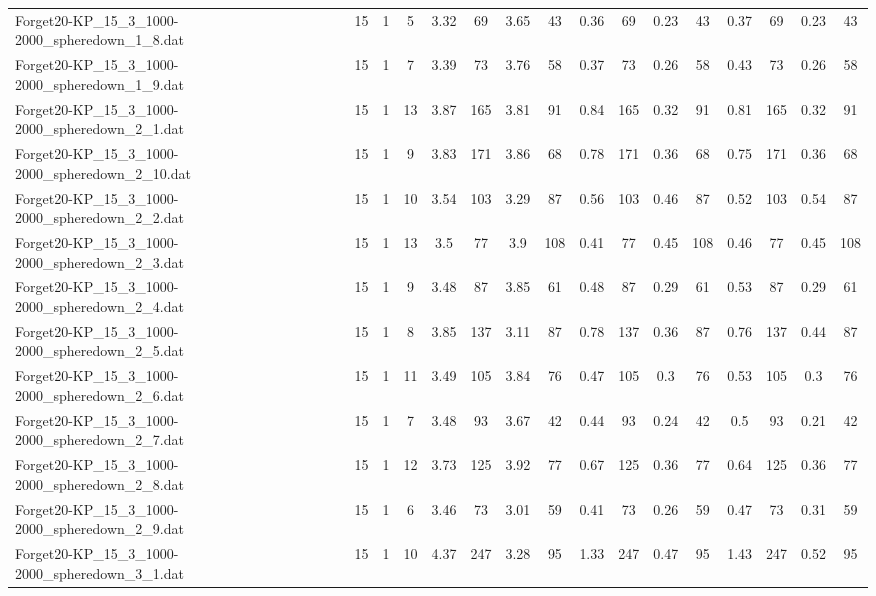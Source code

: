\begin{sidewaystable}[!ht]
{\begin{tabular}{lccccccccccccccc}
Forget20-KP\_15\_3\_1000-2000\_spheredown\_1\_8.dat & 15 & 1 & 5 & 3.32 & 69 & 3.65 & 43 & 0.36 & 69 &  \textcolor{blue2}{0.23} & 43 & 0.37 & 69 &  \textcolor{blue2}{0.23} & 43 \\
Forget20-KP\_15\_3\_1000-2000\_spheredown\_1\_9.dat & 15 & 1 & 7 & 3.39 & 73 & 3.76 & 58 & 0.37 & 73 &  \textcolor{blue2}{0.26} & 58 & 0.43 & 73 &  \textcolor{blue2}{0.26} & 58 \\
Forget20-KP\_15\_3\_1000-2000\_spheredown\_2\_1.dat & 15 & 1 & 13 & 3.87 & 165 & 3.81 & 91 & 0.84 & 165 &  \textcolor{blue2}{0.32} & 91 & 0.81 & 165 &  \textcolor{blue2}{0.32} & 91 \\
Forget20-KP\_15\_3\_1000-2000\_spheredown\_2\_10.dat & 15 & 1 & 9 & 3.83 & 171 & 3.86 & 68 & 0.78 & 171 &  \textcolor{blue2}{0.36} & 68 & 0.75 & 171 &  \textcolor{blue2}{0.36} & 68 \\
Forget20-KP\_15\_3\_1000-2000\_spheredown\_2\_2.dat & 15 & 1 & 10 & 3.54 & 103 & 3.29 & 87 & 0.56 & 103 &  \textcolor{blue2}{0.46} & 87 & 0.52 & 103 & 0.54 & 87 \\
Forget20-KP\_15\_3\_1000-2000\_spheredown\_2\_3.dat & 15 & 1 & 13 & 3.5 & 77 & 3.9 & 108 &  \textcolor{blue2}{0.41} & 77 & 0.45 & 108 & 0.46 & 77 & 0.45 & 108 \\
Forget20-KP\_15\_3\_1000-2000\_spheredown\_2\_4.dat & 15 & 1 & 9 & 3.48 & 87 & 3.85 & 61 & 0.48 & 87 &  \textcolor{blue2}{0.29} & 61 & 0.53 & 87 &  \textcolor{blue2}{0.29} & 61 \\
Forget20-KP\_15\_3\_1000-2000\_spheredown\_2\_5.dat & 15 & 1 & 8 & 3.85 & 137 & 3.11 & 87 & 0.78 & 137 & 0.36 & 87 & 0.76 & 137 & 0.44 & 87 \\
Forget20-KP\_15\_3\_1000-2000\_spheredown\_2\_6.dat & 15 & 1 & 11 & 3.49 & 105 & 3.84 & 76 & 0.47 & 105 &  \textcolor{blue2}{0.3} & 76 & 0.53 & 105 &  \textcolor{blue2}{0.3} & 76 \\
Forget20-KP\_15\_3\_1000-2000\_spheredown\_2\_7.dat & 15 & 1 & 7 & 3.48 & 93 & 3.67 & 42 & 0.44 & 93 & 0.24 & 42 & 0.5 & 93 &  \textcolor{blue2}{0.21} & 42 \\
Forget20-KP\_15\_3\_1000-2000\_spheredown\_2\_8.dat & 15 & 1 & 12 & 3.73 & 125 & 3.92 & 77 & 0.67 & 125 &  \textcolor{blue2}{0.36} & 77 & 0.64 & 125 &  \textcolor{blue2}{0.36} & 77 \\
Forget20-KP\_15\_3\_1000-2000\_spheredown\_2\_9.dat & 15 & 1 & 6 & 3.46 & 73 & 3.01 & 59 & 0.41 & 73 &  \textcolor{blue2}{0.26} & 59 & 0.47 & 73 & 0.31 & 59 \\
Forget20-KP\_15\_3\_1000-2000\_spheredown\_3\_1.dat & 15 & 1 & 10 & 4.37 & 247 & 3.28 & 95 & 1.33 & 247 &  \textcolor{blue2}{0.47} & 95 & 1.43 & 247 & 0.52 & 95 \\

\end{tabular}}
\end{sidewaystable}
